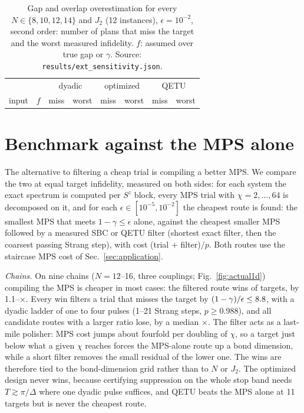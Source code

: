 \documentclass[aps,pra,twocolumn,superscriptaddress,nofootinbib]{revtex4-2}
\begin{document}
\begin{table}[t]
\caption{Gap and overlap overestimation for every $N\in\{8,10,12,14\}$ and $J_2$ (12 instances),
$\epsilon=10^{-2}$, second order: number of plans that miss the target and the worst measured
infidelity. $f$: assumed over true gap or $\gamma$. Source: \texttt{results/ext\_sensitivity.json}.}
\label{tab:senswide}
\begin{ruledtabular}
\begin{tabular}{lrrrrrrr}
 & & \multicolumn{2}{c}{dyadic} & \multicolumn{2}{c}{optimized} & \multicolumn{2}{c}{QETU}\\
input & $f$ & miss & worst & miss & worst & miss & worst\\
\midrule

\end{tabular}
\end{ruledtabular}
\end{table}

\section{Benchmark against the MPS alone}
\label{sec:crossover}

The alternative to filtering a cheap trial is compiling a better MPS. We compare the two at equal target
infidelity, measured on both sides: for each system the exact spectrum is computed per $S^z$ block, every MPS trial
with $\chi=2,\dots,64$ is decomposed on it, and for each $\epsilon\in[10^{-5},10^{-2}]$ the cheapest route is found:
the smallest MPS that meets $1-\gamma\le\epsilon$ alone, against the cheapest smaller MPS followed by a measured SBC
or QETU filter (shortest exact filter, then the coarsest passing Strang step), with cost (trial $+$ filter)$/p$. Both
routes use the staircase MPS cost of Sec.~\ref{sec:application}.

\emph{Chains.} On nine chains ($N=12$--16, three couplings; Fig.~\ref{fig:actual1d}) compiling the MPS is cheaper in
most cases: the filtered route wins \actOneWins{} of \actOneTot{} targets, by 1.1--\actOneRatioMax$\times$. Every win
filters a trial that misses the target by $(1-\gamma)/\epsilon\le8.8$, with a dyadic ladder of one to four
pulses (1--21 Strang steps, $p\ge0.988$), and all \actOneFar{} candidate routes with a larger ratio lose, by a median
\actOneFarMed$\times$. The filter acts as a last-mile polisher: MPS cost jumps about fourfold per doubling of $\chi$,
so a target just below what a given $\chi$ reaches forces the MPS-alone route up a bond dimension, while a short
filter removes the small residual of the lower one. The wins are therefore tied to the bond-dimension grid rather
than to $N$ or $J_2$. The optimized design never wins, because certifying suppression on the whole stop band needs
$T\gtrsim\pi/\Delta$ where one dyadic pulse suffices, and QETU beats the MPS alone at 11 targets but is never the
cheapest route.
\end{document}
